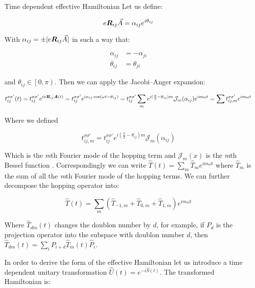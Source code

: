 \begin{section}{Time dependent effective Hamiltonian}
Let us define:

\begin{equation}
\label{Def_alpha}
e\boldsymbol{R}_{ij}\vec{A} = \alpha_{ij} e^{i \theta_{ij}}
\end{equation}

With $\alpha_{ij} = \pm|e\boldsymbol{R}_{ij}\vec{A}|$ in such a way that:

\begin{align}
\alpha_{ij} &= -\alpha_{ji} \label{alphaSym} \\
\theta_{ij} &= \theta_{ji} \label{thetaSym}
\end{align}

and $\theta_{ij} \in \left[0,\pi\right)$. Then we can apply the Jacobi–Anger expansion:

\begin{align*}
t_{ij}^{\sigma \sigma'}(t) = t_{ij}^{\sigma \sigma'}e^{ie\boldsymbol{R}_{ij}\boldsymbol{A}(t)} = t_{ij}^{\sigma \sigma'}e^{i\alpha_{ij} \cos(\omega t - \theta_{ij})} = t_{ij}^{\sigma \sigma'}\sum_m e^{i(\frac{\pi}{2}-\theta_{ij})m} \mathcal{J}_m(\alpha_{ij}) e^{im\omega t} = \sum t_{ij,m}^{\sigma \sigma'} e^{im\omega t}
\end{align*}

Where we defined 

\begin{equation}
\label{HoppAmpFourier}
t_{ij,m}^{\sigma \sigma'} = t_{ij}^{\sigma \sigma'} e^{i(\frac{\pi}{2}-\theta_{ij})m} \mathcal{J}_m(\alpha_{ij})
\end{equation}

Which is the \textit{m}th Fourier mode of the hopping term and $\mathcal{J}_m(x)$ is the \textit{m}th Bessel function \cite{Kitamura2017}. Correspondingly we can write $\hat{T}(t) = \sum_m \hat{T}_m e^{im \omega t}$ where $\hat{T}_m$ is the sum of all the \textit{m}th Fourier mode of the hopping terms. We can further decompose the hopping operator into:

\begin{equation}
\hat{T}(t) = \sum_m (\hat{T}_{-1,m}+\hat{T}_{0,m}+\hat{T}_{1,m})e^{im\omega t}
\end{equation}

Where $\hat{T}_{dm}(t)$ changes the doublon number by $d$, for example, if $\hat{P}_d$ is the projection operator into the subspace with doublon number $d$, then $\hat{T}_{dm}(t) = \sum_i \hat{P}_{i+d}\hat{T}_{m}(t)\hat{P}_i$.

In order to derive the form of the effective Hamiltonian let us introduce a time dependent unitary transformation $\hat{U}(t) = e^{-i\hat{S}(t)}$. The transformed Hamiltonian is:


\end{section}
